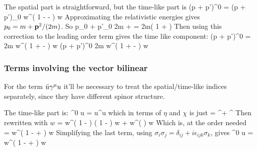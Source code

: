 The spatial part is straightforward, but the time-like part is 
\beq
	(p + p')^0 \srb \sr  = (p + p')_0 w^\dagger \left( 
		1 -   -  
		\right ) w
\eeq
Approximating the relativistic energies gives $p_0 = m + \mathbf{p}^2 / (2m) $.  So
\beq
	p_0 + p'_0 \approx 2m +  = 2m\left( 1 +   \right )
\eeq
Then using this correction to the leading order term gives the time like component:
\beq
	(p + p')^0 \srb \sr  = 2m  w^\dagger \left( 
		1 +   -  
		\right ) w
\eeq
\beq \label{eq:Sh:S0}
	(p + p')^0 \srb \sr  \approx 2m  w^\dagger \left( 
		1 +   -  
		\right ) w
\eeq




\subsubsection{Terms involving the vector bilinear}
For the term $\bar{u} \gamma^\mu u$ it'll be necessary to treat the spatial/time-like indices separately, since they have different spinor structure.

The time-like part is:
\beq
	\srb \gamma^0 u = u^\dagger u
\eeq
which in terms of $\eta$ and $\chi$ is just
\beq
	= \eta^\dagger \eta + \chi^\dagger \chi 
\eeq
Then rewritten with $w$
\beq
	= 	w^\dagger \left( 1 -  \right )  \left( 1 -  \right ) w
		+ w^\dagger \left(   \right ) w 
\eeq
Which is, at the order needed
\beq
	=	 w^\dagger \left( 
		1 -   +  
		\right ) w
\eeq
Simplifying the last term, using $\sigma_i \sigma_j = \delta_{ij} + i\epsilon_{ijk}\sigma_k$, gives
\beq \label{eq:Sh:V0}
	\srb \gamma^0 u = 
			w^\dagger \left( 
		1 -   +  
		\right ) w
\eeq





